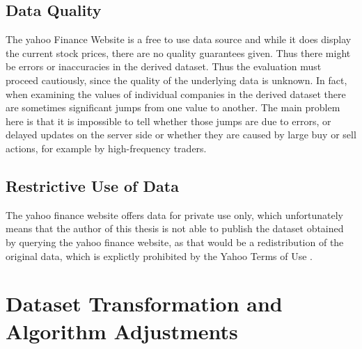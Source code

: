 \subsection{Data Quality}
\label{subsec_dataQuality}
The yahoo Finance Website is a free to use data source and while it does display the current stock prices, there are no quality guarantees given. Thus there might be errors or inaccuracies in the derived dataset. Thus the evaluation must proceed cautiously, since the quality of the underlying data is unknown. In fact, when examining the values of individual companies in the derived dataset there are sometimes significant jumps from one value to another. The main problem here is that it is impossible to tell whether those jumps are due to errors, or delayed updates on the server side or whether they are caused by large buy or sell actions, for example by high-frequency traders.  

\subsection{Restrictive Use of Data}
The yahoo finance website offers data for private use only, which unfortunately means that the author of this thesis is not able to publish the dataset obtained by querying the yahoo finance website, as that would be a redistribution of the original data, which is explictly prohibited by the Yahoo Terms of Use \cite{yahooTermsDeveloper}.

\section{Dataset Transformation and Algorithm Adjustments}
\label{sec_transformation}



